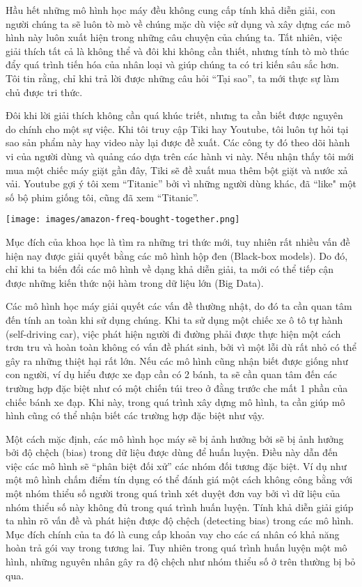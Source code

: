 Hầu hết những mô hình học máy đều không cung cấp tính khả diễn giải, con người chúng ta sẽ luôn tò mò về chúng mặc dù việc sử dụng và xây dựng các mô hình này luôn xuất hiện trong những câu chuyện của chúng ta. Tất nhiên, việc giải thích tất cả là không thể và đôi khi không cần thiết, nhưng tính tò mò thúc đẩy quá trình tiến hóa của nhân loại và giúp chúng ta có tri kiến sâu sắc hơn. Tôi tin rằng, chỉ khi trả lời được những câu hỏi ``Tại sao'', ta mới thực sự làm chủ được tri thức.

Đôi khi lời giải thích không cần quá khúc triết, nhưng ta cần biết được nguyên do chính cho một sự việc. Khi tôi truy cập Tiki hay Youtube, tôi luôn tự hỏi tại sao sản phẩm này hay video này lại được đề xuất. Các công ty đó theo dõi hành vi của người dùng và quảng cáo dựa trên các hành vi này. Nếu nhận thấy tôi mới mua một chiếc máy giặt gần đây, Tiki sẽ đề xuất mua thêm bột giặt và nước xả vải. Youtube gợi ý tôi xem ``Titanic'' bởi vì những người dùng khác, đã ``like" một số bộ phim giống tôi, cũng đã xem ``Titanic''. 

\begin{figure*}[h!]
	\centering
	\texttt{[image: images/amazon-freq-bought-together.png]}
\end{figure*}

Mục đích của khoa học là tìm ra những tri thức mới, tuy nhiên rất nhiều vấn đề hiện nay được giải quyết bằng các mô hình hộp đen (Black-box models). Do đó, chỉ khi ta biến đổi các mô hình về dạng khả diễn giải, ta mới có thể tiếp cận được những kiến thức nội hàm trong dữ liệu lớn (Big Data).

Các mô hình học máy giải quyết các vấn đề thường nhật, do đó ta cần quan tâm đến tính an toàn khi sử dụng chúng. Khi ta sử dụng một chiếc xe ô tô tự hành (self-driving car), việc phát hiện người đi đường phải được thực hiện một cách trơn tru và hoàn toàn không có vấn đề phát sinh, bởi vì một lỗi dù rất nhỏ có thể gây ra những thiệt hại rất lớn. Nếu các mô hình cũng nhận biết được giống như con người, ví dụ hiểu được xe đạp cần có 2 bánh, ta sẽ cần quan tâm đến các trường hợp đặc biệt như có một chiến túi treo ở đằng trước che mất 1 phần của chiếc bánh xe đạp. Khi này, trong quá trình xây dựng mô hình, ta cần giúp mô hình cũng có thể nhận biết các trường hợp đặc biệt như vậy. 

Một cách mặc định, các mô hình học máy sẽ bị ảnh hưởng bởi sẽ bị ảnh hưởng bởi độ chệch (bias) trong dữ liệu được dùng để huấn luyện. Điều này dẫn đến việc các mô hình sẽ ``phân biệt đối xử'' các nhóm đối tương đặc biệt. Ví dụ như một mô hình chấm điểm tín dụng có thể đánh giá một cách không công bằng với một nhóm thiểu số người trong quá trình xét duyệt đơn vay bởi vì dữ liệu của nhóm thiểu số này không đủ trong quá trình huấn luyện. Tính khả diễn giải giúp ta nhìn rõ vấn đề và phát hiện được độ chệch (detecting bias) trong các mô hình. Mục đích chính của ta đó là cung cấp khoản vay cho các cá nhân có khả năng hoàn trả gói vay trong tương lai. Tuy nhiên trong quá trình huấn luyện một mô hình, những nguyên nhân gây ra độ chệch như nhóm thiểu số ở trên thường bị bỏ qua.


